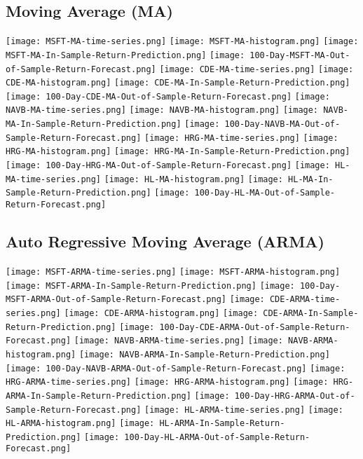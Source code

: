 \subsection{Moving Average (MA)}
\texttt{[image: MSFT-MA-time-series.png]}
\texttt{[image: MSFT-MA-histogram.png]}
\texttt{[image: MSFT-MA-In-Sample-Return-Prediction.png]}
\texttt{[image: 100-Day-MSFT-MA-Out-of-Sample-Return-Forecast.png]}
\texttt{[image: CDE-MA-time-series.png]}
\texttt{[image: CDE-MA-histogram.png]}
\texttt{[image: CDE-MA-In-Sample-Return-Prediction.png]}
\texttt{[image: 100-Day-CDE-MA-Out-of-Sample-Return-Forecast.png]}
\texttt{[image: NAVB-MA-time-series.png]}
\texttt{[image: NAVB-MA-histogram.png]}
\texttt{[image: NAVB-MA-In-Sample-Return-Prediction.png]}
\texttt{[image: 100-Day-NAVB-MA-Out-of-Sample-Return-Forecast.png]}
\texttt{[image: HRG-MA-time-series.png]}
\texttt{[image: HRG-MA-histogram.png]}
\texttt{[image: HRG-MA-In-Sample-Return-Prediction.png]}
\texttt{[image: 100-Day-HRG-MA-Out-of-Sample-Return-Forecast.png]}
\texttt{[image: HL-MA-time-series.png]}
\texttt{[image: HL-MA-histogram.png]}
\texttt{[image: HL-MA-In-Sample-Return-Prediction.png]}
\texttt{[image: 100-Day-HL-MA-Out-of-Sample-Return-Forecast.png]}

\subsection{Auto Regressive Moving Average (ARMA)}
\texttt{[image: MSFT-ARMA-time-series.png]}
\texttt{[image: MSFT-ARMA-histogram.png]}
\texttt{[image: MSFT-ARMA-In-Sample-Return-Prediction.png]}
\texttt{[image: 100-Day-MSFT-ARMA-Out-of-Sample-Return-Forecast.png]}
\texttt{[image: CDE-ARMA-time-series.png]}
\texttt{[image: CDE-ARMA-histogram.png]}
\texttt{[image: CDE-ARMA-In-Sample-Return-Prediction.png]}
\texttt{[image: 100-Day-CDE-ARMA-Out-of-Sample-Return-Forecast.png]}
\texttt{[image: NAVB-ARMA-time-series.png]}
\texttt{[image: NAVB-ARMA-histogram.png]}
\texttt{[image: NAVB-ARMA-In-Sample-Return-Prediction.png]}
\texttt{[image: 100-Day-NAVB-ARMA-Out-of-Sample-Return-Forecast.png]}
\texttt{[image: HRG-ARMA-time-series.png]}
\texttt{[image: HRG-ARMA-histogram.png]}
\texttt{[image: HRG-ARMA-In-Sample-Return-Prediction.png]}
\texttt{[image: 100-Day-HRG-ARMA-Out-of-Sample-Return-Forecast.png]}
\texttt{[image: HL-ARMA-time-series.png]}
\texttt{[image: HL-ARMA-histogram.png]}
\texttt{[image: HL-ARMA-In-Sample-Return-Prediction.png]}
\texttt{[image: 100-Day-HL-ARMA-Out-of-Sample-Return-Forecast.png]}

